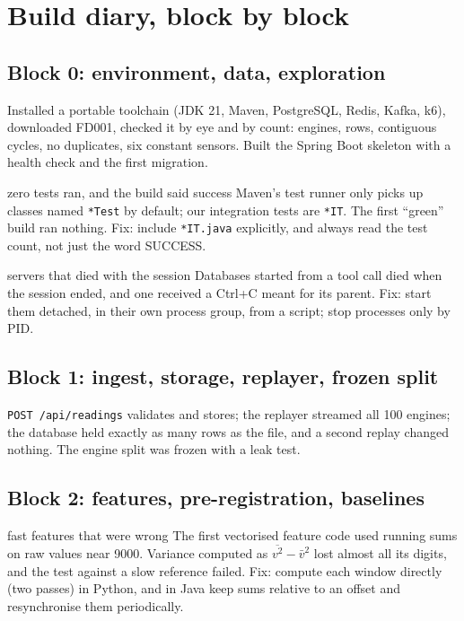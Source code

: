 \documentclass[11pt,a4paper]{article}
\begin{document}
\section{Build diary, block by block}

\subsection{Block 0: environment, data, exploration}
Installed a portable toolchain (JDK 21, Maven, PostgreSQL, Redis, Kafka, k6), downloaded FD001, checked it by
eye and by count: \EdaEngines{} engines, \EdaRows{} rows, contiguous cycles, no duplicates, six constant
sensors. Built the Spring Boot skeleton with a health check and the first migration.

\begin{mistake}{zero tests ran, and the build said success}
Maven's test runner only picks up classes named \texttt{*Test} by default; our integration tests are
\texttt{*IT}. The first ``green'' build ran nothing. Fix: include \texttt{*IT.java} explicitly, and always read
the test count, not just the word SUCCESS.
\end{mistake}

\begin{mistake}{servers that died with the session}
Databases started from a tool call died when the session ended, and one received a Ctrl+C meant for its parent.
Fix: start them detached, in their own process group, from a script; stop processes only by PID.
\end{mistake}

\subsection{Block 1: ingest, storage, replayer, frozen split}
\texttt{POST /api/readings} validates and stores; the replayer streamed all 100 engines; the database held
exactly as many rows as the file, and a second replay changed nothing. The engine split was frozen with a leak
test.

\subsection{Block 2: features, pre-registration, baselines}
\begin{mistake}{fast features that were wrong}
The first vectorised feature code used running sums on raw values near 9000. Variance computed as
$\overline{v^2} - \bar v^2$ lost almost all its digits, and the test against a slow reference failed. Fix: compute
each window directly (two passes) in Python, and in Java keep sums relative to an offset and resynchronise them
periodically.
\end{mistake}
\end{document}
